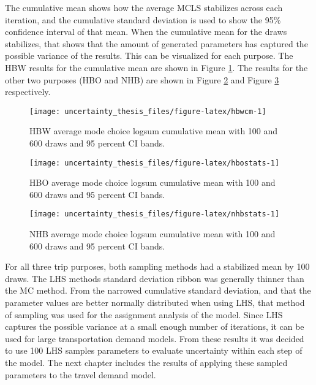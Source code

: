 \documentclass[fancy, masters]{byuthesis}
\begin{document}
The cumulative mean shows how the average MCLS stabilizes across each iteration, and the cumulative standard deviation is used to show the 95\% confidence interval of that mean. When the cumulative mean for the draws stabilizes, that shows that the amount of generated parameters has captured the possible variance of the results. This can be visualized for each purpose. The HBW results for the cumulative mean are shown in Figure \ref{fig:hbwcm}. The results for the other two purposes (HBO and NHB) are shown in Figure \ref{fig:hbostats} and Figure \ref{fig:nhbstats} respectively.

\begin{figure}

{\centering \texttt{[image: uncertainty\_thesis\_files/figure-latex/hbwcm-1]} 

}

\caption{HBW average mode choice logsum cumulative mean with 100 and 600 draws and 95 percent CI bands.}\label{fig:hbwcm}
\end{figure}

\begin{figure}

{\centering \texttt{[image: uncertainty\_thesis\_files/figure-latex/hbostats-1]} 

}

\caption{HBO average mode choice logsum cumulative mean with 100 and 600 draws and 95 percent CI bands.}\label{fig:hbostats}
\end{figure}

\begin{figure}

{\centering \texttt{[image: uncertainty\_thesis\_files/figure-latex/nhbstats-1]} 

}

\caption{NHB average mode choice logsum cumulative mean with 100 and 600 draws and 95 percent CI bands.}\label{fig:nhbstats}
\end{figure}

For all three trip purposes, both sampling methods had a stabilized mean by 100 draws. The LHS methods standard deviation ribbon was generally thinner than the MC method. From the narrowed cumulative standard deviation, and that the parameter values are better normally distributed when using LHS, that method of sampling was used for the assignment analysis of the model. Since LHS captures the possible variance at a small enough number of iterations, it can be used for large transportation demand models. From these results it was decided to use 100 LHS samples parameters to evaluate uncertainty within each step of the model. The next chapter includes the results of applying these sampled parameters to the travel demand model.
\end{document}
